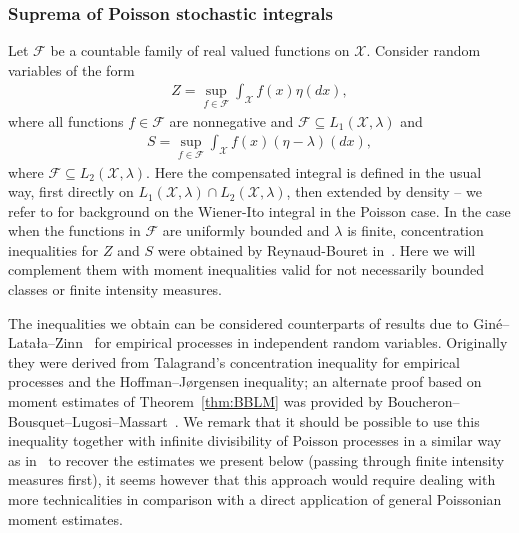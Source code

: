 \documentclass[a4paper]{amsart}
\theoremstyle{definition}
\theoremstyle{remark}
\numberwithin{equation}{section}
\begin{document}
\subsubsection{Suprema of Poisson stochastic integrals}
Let $\mathcal{F}$ be a countable family of real valued functions on $\mathcal{X}$. Consider random variables of the form
\begin{align}\label{eq:empirical-Z}
  Z = \sup_{f\in \mathcal{F}} \int_\mathcal{X} f(x)\eta(dx),
\end{align}
where all functions $f\in \mathcal{F}$ are nonnegative and $\mathcal{F} \subseteq L_1(\mathcal{X},\lambda)$
and
\begin{align}\label{eq:empirical-S}
  S = \sup_{f\in \mathcal{F}} \int_\mathcal{X} f(x)(\eta - \lambda)(dx),
\end{align}
where $\mathcal{F} \subseteq L_2(\mathcal{X},\lambda)$. 
Here the compensated integral is defined in the usual way, first directly on $L_1(\mathcal{X},\lambda)\cap L_2(\mathcal{X},\lambda)$, then extended by density -- we refer to \cite[Chapter 12]{MR3791470} for background on the Wiener-Ito integral in the Poisson case.
In the case when the functions in $\mathcal{F}$ are uniformly bounded and $\lambda$ is finite, concentration inequalities for $Z$ and $S$ were obtained by Reynaud-Bouret in~\cite{MR1981635}. Here we will complement them with moment inequalities valid for not necessarily bounded classes or finite intensity measures.

The inequalities we obtain can be considered counterparts of results due to Gin\'e--Lata{\l}a--Zinn~\cite{MR1857312} for empirical processes in independent random variables. Originally they were derived from Talagrand's concentration inequality for empirical processes and the Hoffman--J{\o}rgensen inequality; an alternate proof based on moment estimates of Theorem~\ref{thm:BBLM} was provided by Boucheron--Bousquet--Lugosi--Massart~\cite{MR2123200}. We remark that it should be possible to use this inequality together with infinite divisibility of Poisson processes in a similar way as in~\cite{MR1981635} to recover the estimates we present below (passing through finite intensity measures first), it seems however that this approach would require dealing with more technicalities in comparison with a direct application of general Poissonian moment estimates.
\end{document}
